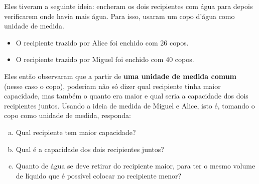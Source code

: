 \begin{atividade}{}
Eles tiveram a seguinte ideia: encheram os dois recipientes com água para depois verificarem onde havia mais água. Para isso, usaram um copo d'água como unidade de medida.
\begin{itemize}
 \item O recipiente trazido por Alice foi enchido com 26 copos.
 \item O recipiente trazido por Miguel foi enchido com 40 copos.
\end{itemize}
Eles então observaram que a partir de {\bf uma unidade de medida comum} (nesse caso o copo), poderiam não só dizer qual recipiente tinha maior capacidade, mas também o quanto era maior e qual seria a capacidade dos dois recipientes juntos.
Usando a ideia de medida de Miguel e Alice, isto é, tomando o copo como unidade de medida, responda:
  \begin{enumerate}[a)]
   \item Qual recipiente tem maior capacidade?
   \item Qual é a capacidade dos dois recipientes juntos?
   \item Quanto de água se deve retirar do recipiente maior, para ter o mesmo volume de líquido que é possível colocar no recipiente menor?
  \end{enumerate}
\end{atividade}


